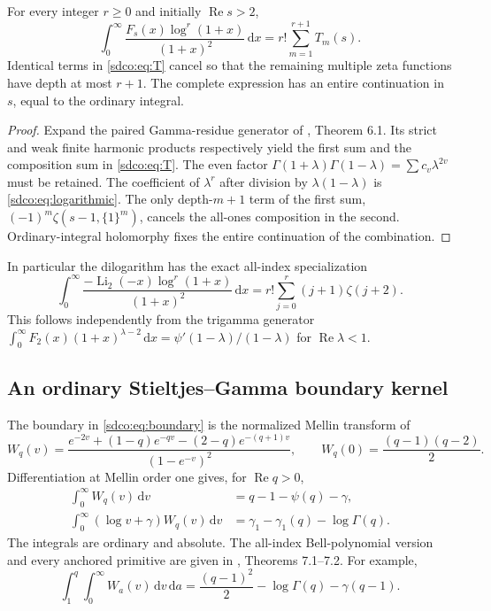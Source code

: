 \begin{theorem}
\label{sdco:thm:logarithmic}
For every integer $r\ge0$ and initially $\operatorname{Re}s>2$,
\begin{equation}\label{sdco:eq:logarithmic}
 \int_0^\infty\frac{F_s(x)\log^r(1+x)}{(1+x)^2}\,\mathrm dx
 =r!\sum_{m=1}^{r+1}T_m(s).
\end{equation}
Identical terms in \eqref{sdco:eq:T} cancel so that the remaining multiple
zeta functions have depth at most $r+1$. The complete expression has an
entire continuation in $s$, equal to the ordinary integral.
\end{theorem}
\begin{proof}
Expand the paired Gamma-residue generator of \cite{SDCO2026}, Theorem 6.1.
Its strict and weak finite harmonic products respectively yield the first
sum and the composition sum in \eqref{sdco:eq:T}. The even factor
$\Gamma(1+\lambda)\Gamma(1-\lambda)=\sum c_v\lambda^{2v}$ must be retained.
The coefficient of $\lambda^r$ after division by $\lambda(1-\lambda)$ is
\eqref{sdco:eq:logarithmic}. The only depth-$m+1$ term of the first sum,
$(-1)^m\zeta(s-1,\{1\}^m)$, cancels the all-ones composition in the second.
Ordinary-integral holomorphy fixes the entire continuation of the combination.
\end{proof}
In particular the dilogarithm has the exact all-index specialization
\[
 \int_0^\infty\frac{-\operatorname{Li}_2(-x)\log^r(1+x)}{(1+x)^2}\,\mathrm dx
 =r!\sum_{j=0}^r(j+1)\zeta(j+2).
\]
This follows independently from the trigamma generator
$\int_0^\infty F_2(x)(1+x)^{\lambda-2}\,\mathrm dx
=\psi'(1-\lambda)/(1-\lambda)$ for $\operatorname{Re}\lambda<1$.

\subsection{An ordinary Stieltjes--Gamma boundary kernel}
The boundary in \eqref{sdco:eq:boundary} is the normalized Mellin transform of
\[
 W_q(v)=\frac{e^{-2v}+(1-q)e^{-qv}-(2-q)e^{-(q+1)v}}{(1-e^{-v})^2},
 \qquad W_q(0)=\frac{(q-1)(q-2)}2.
\]
Differentiation at Mellin order one gives, for $\operatorname{Re}q>0$,
\begin{align*}
 \int_0^\infty W_q(v)\,\mathrm dv&=q-1-\psi(q)-\gamma,\\
 \int_0^\infty(\log v+\gamma)W_q(v)\,\mathrm dv
 &=\gamma_1-\gamma_1(q)-\log\Gamma(q).
\end{align*}
The integrals are ordinary and absolute. The all-index Bell-polynomial
version and every anchored primitive are given in \cite{SDCO2026},
Theorems 7.1--7.2. For example,
\[
 \int_1^q\int_0^\infty W_a(v)\,\mathrm dv\,\mathrm da
 =\frac{(q-1)^2}{2}-\log\Gamma(q)-\gamma(q-1).
\]

